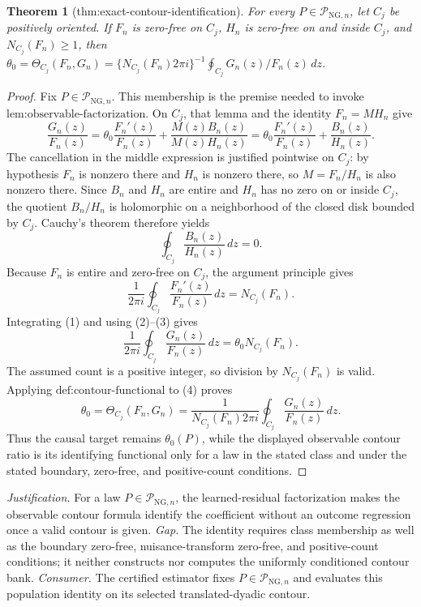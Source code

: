 \documentclass{article}
\newtheorem{theorem}{Theorem}
\begin{document}
\begin{theorem}[thm:exact-contour-identification]\label{thm:exact-contour-identification}
For every \(P\in\mathcal P_{\mathrm{NG},n}\), let \(C_j\) be positively oriented. If \(F_n\) is zero-free on \(C_j\), \(H_n\) is zero-free on and inside \(C_j\), and \(N_{C_j}(F_n)\ge1\), then \(\theta_0=\Theta_{C_j}(F_n,G_n)=\{N_{C_j}(F_n)2\pi i\}^{-1}\oint_{C_j}G_n(z)/F_n(z)\,dz\).
\end{theorem}
\begin{proof}
Fix \(P\in\mathcal P_{\mathrm{NG},n}\).  This membership is the premise needed to invoke \(\text{lem:observable-factorization}\).  On \(C_j\), that lemma and the identity \(F_n=M H_n\) give
\[
 \frac{G_n(z)}{F_n(z)}
 =\theta_0\frac{F_n'(z)}{F_n(z)}+
   \frac{M(z)B_n(z)}{M(z)H_n(z)}
 =\theta_0\frac{F_n'(z)}{F_n(z)}+\frac{B_n(z)}{H_n(z)}.
 \tag{1}
\]
The cancellation in the middle expression is justified pointwise on \(C_j\): by hypothesis \(F_n\) is nonzero there and \(H_n\) is nonzero there, so \(M=F_n/H_n\) is also nonzero there.  Since \(B_n\) and \(H_n\) are entire and \(H_n\) has no zero on or inside \(C_j\), the quotient \(B_n/H_n\) is holomorphic on a neighborhood of the closed disk bounded by \(C_j\).  Cauchy's theorem therefore yields
\[
 \oint_{C_j}\frac{B_n(z)}{H_n(z)}\,dz=0.
 \tag{2}
\]
Because \(F_n\) is entire and zero-free on \(C_j\), the argument principle gives
\[
 \frac{1}{2\pi i}\oint_{C_j}
 \frac{F_n'(z)}{F_n(z)}\,dz=N_{C_j}(F_n).
 \tag{3}
\]
Integrating (1) and using (2)--(3) gives
\[
 \frac{1}{2\pi i}\oint_{C_j}\frac{G_n(z)}{F_n(z)}\,dz
 =\theta_0N_{C_j}(F_n).
 \tag{4}
\]
The assumed count is a positive integer, so division by \(N_{C_j}(F_n)\) is valid.  Applying \(\text{def:contour-functional}\) to (4) proves
\[
 \theta_0
 =\Theta_{C_j}(F_n,G_n)
 =\frac{1}{N_{C_j}(F_n)2\pi i}
   \oint_{C_j}\frac{G_n(z)}{F_n(z)}\,dz.
\]
Thus the causal target remains \(\theta_0(P)\), while the displayed observable contour ratio is its identifying functional only for a law in the stated class and under the stated boundary, zero-free, and positive-count conditions.
\end{proof}
\par\smallskip\noindent \textit{Justification.} For a law \(P\in\mathcal P_{\mathrm{NG},n}\), the learned-residual factorization makes the observable contour formula identify the coefficient without an outcome regression once a valid contour is given. \textit{Gap.} The identity requires class membership as well as the boundary zero-free, nuisance-transform zero-free, and positive-count conditions; it neither constructs nor computes the uniformly conditioned contour bank. \textit{Consumer.} The certified estimator fixes \(P\in\mathcal P_{\mathrm{NG},n}\) and evaluates this population identity on its selected translated-dyadic contour.
\end{document}
